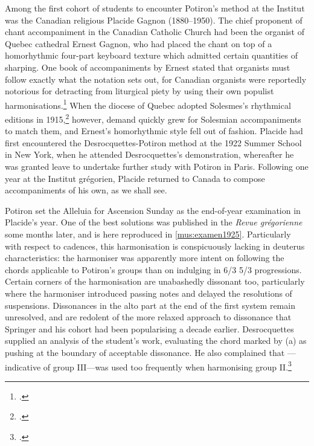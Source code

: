 Among the first cohort of students to encounter Potiron's method at the Institut was the Canadian religious Placide Gagnon (1880--1950).
The chief proponent of chant accompaniment in the Canadian Catholic Church had been the organist of Quebec cathedral Ernest Gagnon, who had placed the chant on top of a homorhythmic four-part keyboard texture which admitted certain quantities of sharping.
One book of accompaniments by Ernest stated that organists must follow exactly what the notation sets out, for Canadian organists were reportedly notorious for detracting from liturgical piety by using their own populist harmonisations.\footcite[unpaginated `Préface', p.~142 and \emph{passim}]{GagnonAccompagnementorguechants1903}
When the diocese of Quebec adopted Solesmes's rhythmical editions in 1915,\footcite[105--106]{N.restaurationchantgregorien1927} however, demand quickly grew for Solesmian accompaniments to match them, and Ernest's homorhythmic style fell out of fashion.
Placide had first encountered the Desrocquettes-Potiron method at the 1922 Summer School in New York, when he attended Desrocquettes's demonstration, whereafter he was granted leave to undertake further study with Potiron in Paris.
Following one year at the Institut grégorien, Placide returned to Canada to compose accompaniments of his own, as we shall see.

Potiron set the Alleluia for Ascension Sunday as the end-of-year examination in Placide's year.
One of the best solutions was published in the \emph{Revue grégorienne} some months later, and is here reproduced in \cref{mus:examen1925}.
Particularly with respect to cadences, this harmonisation is conspicuously lacking in deuterus characteristics: the harmoniser was apparently more intent on following the chords applicable to Potiron's groups than on indulging in  6/3 \rightarrow{}  5/3 progressions.
Certain corners of the harmonisation are unabashedly dissonant too, particularly where the harmoniser introduced passing notes and delayed the resolutions of suspensions.
Dissonances in the alto part at the end of the first system remain unresolved, and are redolent of the more relaxed approach to dissonance that Springer and his cohort had been popularising a decade earlier.
Desrocquettes supplied an analysis of the student's work, evaluating the chord marked by (a) as pushing at the boundary of acceptable dissonance.
He also complained that \kern 1pt\flat{}---indicative of group III---was used too frequently when harmonising group II.\footcite[137]{Desrocquettesexamenfinannee1925}

